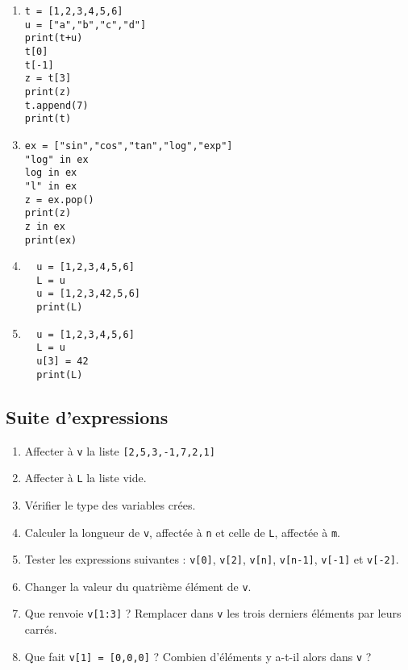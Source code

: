 \begin{multicols}{2}

\begin{enumerate}[label=\emph{\alph*)}]
\item 
\begin{lstlisting}
t = [1,2,3,4,5,6]
u = ["a","b","c","d"]
print(t+u)
t[0]
t[-1]
z = t[3]
print(z)
t.append(7)
print(t)
\end{lstlisting}
\end{enumerate}
\begin{enumerate}[label=\emph{\alph*)}]
\setcounter{enumi}{2}
\item
\begin{lstlisting}
ex = ["sin","cos","tan","log","exp"]
"log" in ex
log in ex
"l" in ex
z = ex.pop()
print(z)
z in ex
print(ex)
\end{lstlisting}
\end{enumerate}
\begin{enumerate}[label=\emph{\alph*)}]
\setcounter{enumi}{3}
\item 
\begin{lstlisting}
  u = [1,2,3,4,5,6]
  L = u
  u = [1,2,3,42,5,6]
  print(L)
\end{lstlisting}
\end{enumerate}
\begin{enumerate}[label=\emph{\alph*)}]
\setcounter{enumi}{4}
\item
\begin{lstlisting}
  u = [1,2,3,4,5,6]
  L = u
  u[3] = 42
  print(L)
\end{lstlisting}
\end{enumerate}

\subsection*{Suite d'expressions}


\question{}
\begin{enumerate}[label = \emph{\alph*)}]
  \item Affecter à \texttt{v} la liste \texttt{[2,5,3,-1,7,2,1]}
  \item Affecter à \texttt{L} la liste vide.
  \item Vérifier le type des variables crées.
  \item Calculer la longueur de \texttt{v}, affectée à \texttt{n} et celle de \texttt{L}, affectée à \texttt{m}.
  \item Tester les expressions suivantes : \texttt{v[0]}, \texttt{v[2]}, \texttt{v[n]}, \texttt{v[n-1]}, \texttt{v[-1]} et \texttt{v[-2]}.
  \item Changer la valeur du quatrième élément de \texttt{v}.
  \item Que renvoie \texttt{v[1:3]} ? Remplacer dans \texttt{v} les trois derniers éléments par leurs carrés.
  \item Que fait \texttt{v[1] = [0,0,0]} ? Combien d'éléments y a-t-il alors dans \texttt{v} ?
\end{enumerate}


\end{multicols}
